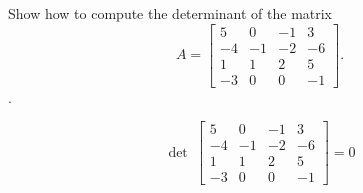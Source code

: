 
\begin{exerciseStatement}


Show how to compute the determinant of the matrix \[A= \left[\begin{array}{cccc}
5 & 0 & -1 & 3 \\
-4 & -1 & -2 & -6 \\
1 & 1 & 2 & 5 \\
-3 & 0 & 0 & -1
\end{array}\right] .\].


\end{exerciseStatement}
    
\begin{exerciseAnswer} 
\[\operatorname{det}\  \left[\begin{array}{cccc}
5 & 0 & -1 & 3 \\
-4 & -1 & -2 & -6 \\
1 & 1 & 2 & 5 \\
-3 & 0 & 0 & -1
\end{array}\right] = 0 \]
\end{exerciseAnswer}
    

